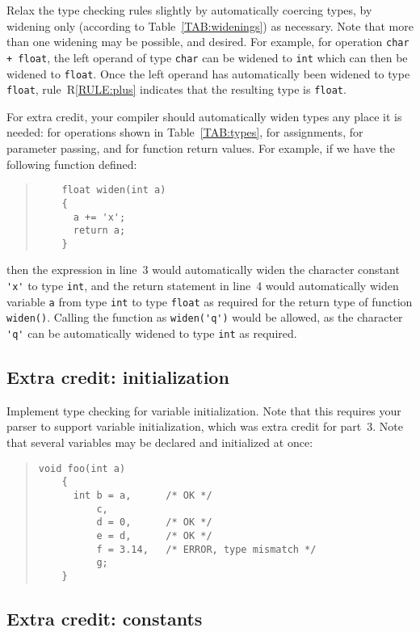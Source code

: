 \documentclass{article}
\newcounter{rule}
\newcommand{\parser}{3}
\begin{document}
Relax the type checking rules slightly by
automatically coercing types,
by widening only (according to Table~\ref{TAB:widenings})
as necessary.
Note that more than one widening may be possible, and desired.
For example, for operation {\tt char + float},
the left operand of type {\tt char} can be widened to {\tt int}
which can then be widened to {\tt float}.
Once the left operand has automatically been widened to type {\tt float},
rule~R\ref{RULE:plus}
  indicates that the resulting type is {\tt float}.

For extra credit,
your compiler should automatically widen types any place it is needed:
for operations shown in Table~\ref{TAB:types},
for assignments,
for parameter passing,
and for function return values.
For example, if we have the following function defined:
\begin{quote}
  \begin{lstlisting}
    float widen(int a)
    {
      a += 'x';
      return a;
    }
  \end{lstlisting}
\end{quote}
then the expression in line~3 would automatically widen
the character constant \verb|'x'| to type {\tt int},
and the return statement in line~4 would automatically
widen variable {\tt a} from type {\tt int} to type {\tt float}
as required for the return type of function {\tt widen()}.
Calling the function as \verb|widen('q')|
would be allowed, as the character \verb|'q'| can
be automatically widened to type {\tt int} as required.


\subsection{Extra credit: initialization}
\label{SEC:initialize}

Implement type checking for variable initialization.
Note that this requires your parser to support variable initialization,
which was extra credit for part~\parser.
Note that several variables may be declared and initialized at once:
\begin{quote}
  \begin{lstlisting}[numbers=none]
    void foo(int a)
    {
      int b = a,      /* OK */
          c,
          d = 0,      /* OK */
          e = d,      /* OK */
          f = 3.14,   /* ERROR, type mismatch */
          g;
    }
  \end{lstlisting}
\end{quote}

\subsection{Extra credit: constants}
\label{SEC:constants}
\end{document}
